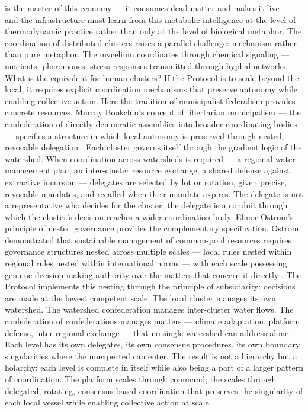 is the master of this economy — it consumes dead matter and makes it live — and the  infrastructure must learn from this metabolic intelligence at the level of thermodynamic practice rather than only at the level of biological metaphor. The coordination of distributed clusters raises a parallel challenge: mechanism rather than pure metaphor. The mycelium coordinates through chemical signaling — nutrients, pheromones, stress responses transmitted through hyphal networks. What is the equivalent for human clusters? If the  Protocol is to scale beyond the local, it requires explicit coordination mechanisms that preserve autonomy while enabling collective action. Here the tradition of municipalist federalism provides concrete resources. Murray Bookchin’s concept of libertarian municipalism — the confederation of directly democratic assemblies into broader coordinating bodies — specifies a structure in which local autonomy is preserved through nested, revocable delegation \cite{bookchin_1998}. Each cluster governs itself through the gradient logic of the watershed. When coordination across watersheds is required — a regional water management plan, an inter-cluster resource exchange, a shared defense against extractive incursion — delegates are selected by lot or rotation, given precise, revocable mandates, and recalled when their mandate expires. The delegate is not a representative who decides for the cluster; the delegate is a conduit through which the cluster’s decision reaches a wider coordination body. Elinor Ostrom’s principle of nested governance provides the complementary specification. Ostrom demonstrated that sustainable management of common-pool resources requires governance structures nested across multiple scales — local rules nested within regional rules nested within international norms — with each scale possessing genuine decision-making authority over the matters that concern it directly \cite{ostrom_1990}. The  Protocol implements this nesting through the principle of subsidiarity: decisions are made at the lowest competent scale. The local cluster manages its own watershed. The watershed confederation manages inter-cluster water flows. The confederation of confederations manages matters — climate adaptation, platform defense, inter-regional exchange — that no single watershed can address alone. Each level has its own delegates, its own consensus procedures, its own boundary singularities where the unexpected can enter. The result is not a hierarchy but a holarchy: each level is complete in itself while also being a part of a larger pattern of coordination. The platform scales through command; the  scales through delegated, rotating, consensus-based coordination that preserves the singularity of each local vessel while enabling collective action at scale.

